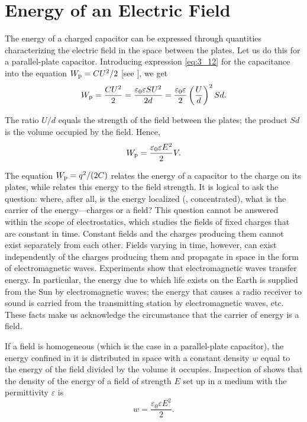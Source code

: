 \section{Energy of an Electric Field}\label{sec:4_3}

The energy of a charged capacitor can be expressed through quantities characterizing the electric field in the space between the plates. Let us do this for a parallel-plate capacitor. Introducing expression \eqref{eq:3_12} for the capacitance into the equation $W_{\text{p}}=CU^2/2$ [see ], we get
\begin{equation*}
	W_{\text{p}} = \frac{C U^2}{2} = \frac{\varepsilon_0 \varepsilon S U^2}{2 d} = \frac{\varepsilon_0 \varepsilon}{2} \left(\frac{U}{d}\right)^2 S d.
\end{equation*}

\noindent
The ratio $U/d$ equals the strength of the field between the plates; the product $Sd$ is the volume occupied by the field. Hence,
\begin{equation}\label{eq:4_9}
	W_{\text{p}} = \frac{\varepsilon_0 \varepsilon E^2}{2} V.
\end{equation}

The equation $W_{\text{p}}=q^2/(2C)$ relates the energy of a capacitor to the charge on its plates, while  relates this energy to the field strength. It is logical to ask the question: where, after all, is the energy localized (\ie, concentrated), what is the carrier of the energy---charges or a field? This question cannot be answered within the scope of electrostatics, which studies the fields of fixed charges that are constant in time. Constant fields and the charges producing them cannot exist separately from each other. Fields varying in time, however, can exist independently of the charges producing them and propagate in space in the form of electromagnetic waves. Experiments show that electromagnetic waves transfer energy. In particular, the energy due to which life exists on the Earth is supplied from the Sun by electromagnetic waves; the energy that causes a radio receiver to sound is carried from the transmitting station by electromagnetic waves, etc. These facts make us acknowledge the circumstance that the carrier of energy is a field.

If a field is homogeneous (which is the case in a parallel-plate capacitor), the energy confined in it is distributed in space with a constant density $w$ equal to the energy of the field divided by the volume it occupies. Inspection of  shows that the density of the energy of a field of strength $E$ set up in a medium with the permittivity $\varepsilon$ is
\begin{equation}\label{eq:4_10}
	w = \frac{\varepsilon_0 \varepsilon E^2}{2}.
\end{equation}

